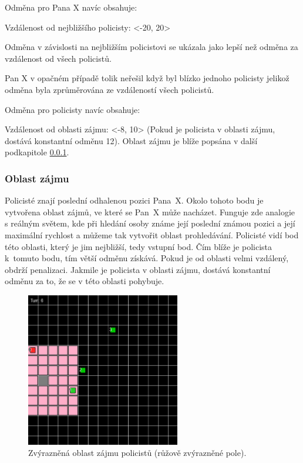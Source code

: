 \bigskip

Odměna pro Pana X navíc obsahuje:
\begin{myitemize}
  \item Vzdálenost od nejbližšího policisty: <-20, 20>
  \begin{myitemize}
    \item Odměna v závislosti na nejbližším policistovi se ukázala jako lepší než odměna za vzdálenost od všech policistů.
    \item Pan X v opačném případě tolik neřešil když byl blízko jednoho policisty jelikož odměna byla zprůměrována ze vzdáleností všech policistů.
  \end{myitemize}
\end{myitemize}

Odměna pro policisty navíc obsahuje:
\begin{myitemize}
  \item Vzdálenost od oblasti zájmu: <-8, 10> (Pokud je policista v oblasti zájmu, dostává konstantní odměnu 12).
  Oblast zájmu je blíže popsána v další podkapitole \ref{subsubsec:oblast_zajmu}.
\end{myitemize}

\subsubsection{Oblast zájmu}
\label{subsubsec:oblast_zajmu}

Policisté znají poslední odhalenou pozici Pana~X\@.
Okolo tohoto bodu je vytvořena oblast zájmů, ve které se Pan~X může nacházet.
Funguje zde analogie s reálným světem, kde při hledání osoby známe její poslední známou pozici a její maximální rychlost a můžeme tak vytvořit oblast prohledávání.
Policisté vidí bod této oblasti, který je jim nejbližší, tedy vstupní bod.
Čím blíže je policista k~tomuto bodu, tím větší odměnu získává.
Pokud je od oblasti velmi vzdálený, obdrží penalizaci.
Jakmile je policista v oblasti zájmu, dostává konstantní odměnu za to, že se v této oblasti pohybuje.

\begin{figure}[H]
	\centering
	\includegraphics[width=0.6\textwidth]{obrazky-figures/interest_area}
      \caption{Zvýrazněná oblast zájmu policistů (růžově zvýrazněné pole).}
    \label{fig:game_11}
\end{figure}

